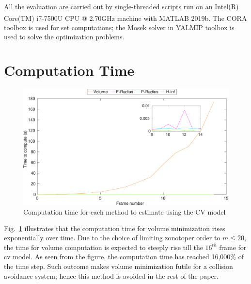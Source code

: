 All the evaluation are carried out by single-threaded scripts run on an Intel(R) Core(TM) i7-7500U CPU @ 2.70GHz machine with MATLAB\textsuperscript{\tiny\textregistered} 2019b. The CORA toolbox is used for set computations; the Mosek solver in YALMIP toolbox is used to solve the optimization problems.

\section{Computation Time}
\begin{figure}[H]
\centering
\includegraphics[width=\linewidth]{figures/timegraphh}
\caption{Computation time for each method to estimate using the CV model}
\label{fig:timegraph}
\end{figure}
Fig.~\ref{fig:timegraph} illustrates that the computation time for volume minimization rises exponentially over time. Due to the choice of limiting zonotoper order to $m\leq20$, the time for volume computation is expected to steeply rise till the $16^{th}$ frame for cv model. As seen from the figure, the computation time has reached 16,000\% of the time step. Such outcome makes volume minimization futile for a collision avoidance system; hence this method is avoided in the rest of the paper.

